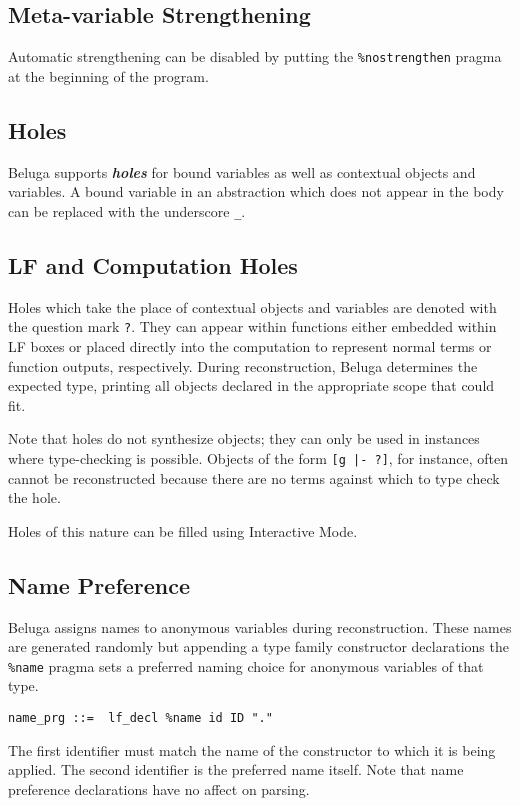 \documentclass[11pt]{article}
\begin{document}
\subsection{Meta-variable Strengthening}
Automatic strengthening can be disabled by putting the \texttt{\%nostrengthen} pragma at the beginning of the program.

\subsection{Holes}
Beluga supports \textit{\textbf{holes}} for bound variables as well as contextual objects and variables. A bound variable in an abstraction which does not appear in the body can be replaced with the underscore \texttt{\_}.

\subsection{LF and Computation Holes}
Holes which take the place of contextual objects and variables are denoted with the question mark \texttt{?}. They can appear within functions either embedded within LF boxes or placed directly into the computation to represent normal terms or function outputs, respectively. During reconstruction, Beluga determines the expected type, printing all objects declared in the appropriate scope that could fit.

Note that holes do not synthesize objects; they can only be used in instances where type-checking is possible. Objects of the form \texttt{[g |- ?]}, for instance, often cannot be reconstructed because there are no terms against which to type check the hole.

Holes of this nature can be filled using Interactive Mode.

\subsection{Name Preference}
Beluga assigns names to anonymous variables during reconstruction. These names are generated randomly but appending a type family constructor declarations the \texttt{\%name} pragma sets a preferred naming choice for anonymous variables of that type. 
\begin{verbatim}
name_prg ::=  lf_decl %name id ID "."    
\end{verbatim}
The first identifier must match the name of the constructor to which it is being applied. The second identifier is the preferred name itself. Note that name preference declarations have no affect on parsing. 
\end{document}
